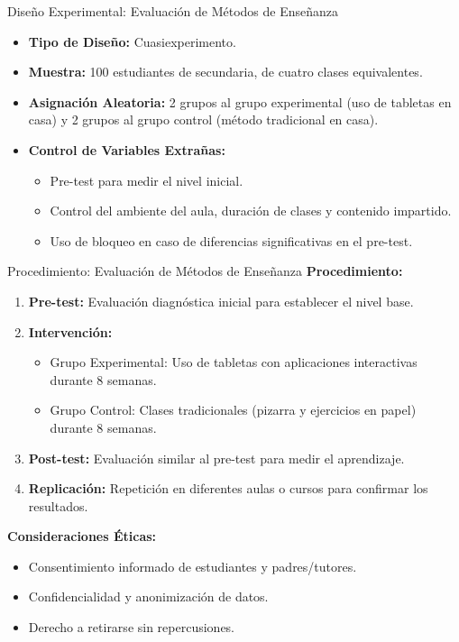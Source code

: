 ﻿\documentclass{beamer}
\begin{document}
\begin{frame}{Diseño Experimental: Evaluación de Métodos de Enseñanza}
  \begin{itemize}
      \item \textbf{Tipo de Diseño:} Cuasiexperimento.
      \item \textbf{Muestra:} 100 estudiantes de secundaria, de cuatro clases equivalentes.
      \item \textbf{Asignación Aleatoria:} 2 grupos al grupo experimental (uso de tabletas en casa) y 2 grupos al grupo control (método tradicional en casa).
      \item \textbf{Control de Variables Extrañas:}
      \begin{itemize}
          \item Pre-test para medir el nivel inicial.
          \item Control del ambiente del aula, duración de clases y contenido impartido.
          \item Uso de bloqueo en caso de diferencias significativas en el pre-test.
      \end{itemize}
  \end{itemize}
\end{frame}

\begin{frame}{Procedimiento: Evaluación de Métodos de Enseñanza}
  \textbf{Procedimiento:}
  \begin{enumerate}
      \item \textbf{Pre-test:} Evaluación diagnóstica inicial para establecer el nivel base.
      \item \textbf{Intervención:}
      \begin{itemize}
          \item Grupo Experimental: Uso de tabletas con aplicaciones interactivas durante 8 semanas.
          \item Grupo Control: Clases tradicionales (pizarra y ejercicios en papel) durante 8 semanas.
      \end{itemize}
      \item \textbf{Post-test:} Evaluación similar al pre-test para medir el aprendizaje.
      \item \textbf{Replicación:} Repetición en diferentes aulas o cursos para confirmar los resultados.
  \end{enumerate}
  
  \vspace{2mm}
  \textbf{Consideraciones Éticas:}
  \begin{itemize}
      \item Consentimiento informado de estudiantes y padres/tutores.
      \item Confidencialidad y anonimización de datos.
      \item Derecho a retirarse sin repercusiones.
  \end{itemize}
 
\end{frame}
\end{document}
